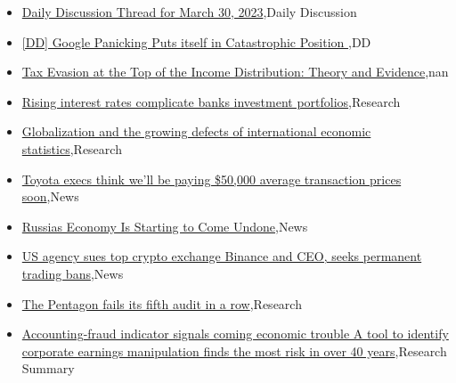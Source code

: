 \documentclass{article}%
\begin{document}
%
\begin{itemize}%
\item%
\href{https://reddit.com/r/wallstreetbets/comments/126i78o/daily\_discussion\_thread\_for\_march\_30\_2023/}{Daily Discussion Thread for March 30, 2023},Daily Discussion%
\item%
\href{https://reddit.com/r/wallstreetbets/comments/126h6cj/dd\_google\_panicking\_puts\_itself\_in\_catastrophic/}{[DD]  Google Panicking Puts itself in Catastrophic Position },DD%
\item%
\href{https://reddit.com/r/Economics/comments/1265sh4/tax\_evasion\_at\_the\_top\_of\_the\_income\_distribution/}{Tax Evasion at the Top of the Income Distribution: Theory and Evidence},nan%
\item%
\href{https://reddit.com/r/Economics/comments/125prjj/rising\_interest\_rates\_complicate\_banks\_investment/}{Rising interest rates complicate banks investment portfolios},Research%
\item%
\href{https://reddit.com/r/Economics/comments/125ml7p/globalization\_and\_the\_growing\_defects\_of/}{Globalization and the growing defects of international economic statistics},Research%
\item%
\href{https://reddit.com/r/Economics/comments/125a4l7/toyota\_execs\_think\_well\_be\_paying\_50000\_average/}{Toyota execs think we'll be paying \$50,000 average transaction prices soon},News%
\item%
\href{https://reddit.com/r/Economics/comments/1256hgg/russias\_economy\_is\_starting\_to\_come\_undone/}{Russias Economy Is Starting to Come Undone},News%
\item%
\href{https://reddit.com/r/Economics/comments/124zj8q/us\_agency\_sues\_top\_crypto\_exchange\_binance\_and/}{US agency sues top crypto exchange Binance and CEO, seeks permanent trading bans},News%
\item%
\href{https://reddit.com/r/Economics/comments/124yruw/the\_pentagon\_fails\_its\_fifth\_audit\_in\_a\_row/}{The Pentagon fails its fifth audit in a row},Research%
\item%
\href{https://reddit.com/r/Economics/comments/124xyeh/accountingfraud\_indicator\_signals\_coming\_economic/}{Accounting-fraud indicator signals coming economic trouble  A tool to identify corporate earnings manipulation finds the most risk in over 40 years},Research Summary%
\end{itemize}%
\end{document}
